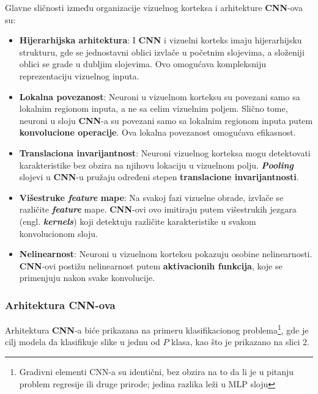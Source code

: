 \documentclass[12pt]{article}
\begin{document}
   Glavne sličnosti \cite{human_visual_cortex} između organizacije vizuelnog korteksa i arhitekture \textbf{CNN}-ova su:
   \begin{itemize}
   \item \textbf{Hijerarhijska arhitektura}: I \textbf{CNN} i vizuelni korteks imaju hijerarhijsku strukturu, 
   gde se jednostavni oblici izvlače u početnim slojevima, a složeniji oblici se grade u dubljim slojevima. 
   Ovo omogućava kompleksniju reprezentaciju vizuelnog inputa.
   \item \textbf{Lokalna povezanost}: Neuroni u vizuelnom korteksu su povezani samo sa 
   lokalnim regionom inputa, a ne sa celim vizuelnim poljem. Slično tome, neuroni 
   u sloju \textbf{CNN}-a su povezani samo sa lokalnim regionom inputa putem \textbf{konvolucione operacije}. 
   Ova lokalna povezanost omogućava efikasnost.
   \item \textbf{Translaciona invarijantnost}: Neuroni vizuelnog korteksa mogu detektovati karakteristike
    bez obzira na njihovu lokaciju u vizuelnom polju. \textbf{\textit{Pooling}} slojevi u \textbf{CNN}-u pružaju određeni 
    stepen \textbf{translacione invarijantnosti}.
    \item \textbf{Višestruke \textit{feature} mape}: Na svakoj fazi vizuelne obrade, izvlače se različite \textbf{\textit{feature}} mape.
    \textbf{CNN}-ovi ovo imitiraju putem višestrukih jezgara (engl. \textbf{\textit{kernels}}) koji detektuju različite karakteristike
      u svakom konvolucionom sloju.
   \item \textbf{Nelinearnost}: Neuroni u vizuelnom korteksu pokazuju osobine nelinearnosti. 
   \textbf{CNN}-ovi postižu nelinearnost putem \textbf{aktivacionih funkcija}, koje se primenjuju nakon svake konvolucije.
   
   \end{itemize}
   
   \newpage

   \subsubsection{Arhitektura \textbf{CNN}-ova}
   Arhitektura \textbf{CNN}-a biće prikazana na primeru klasifikacionog
    problema\footnote{Gradivni elementi CNN-a su identični, bez obzira na to
     da li je u pitanju problem regresije ili druge prirode; jedina razlika leži u MLP sloju}, 
     gde je cilj modela da klasifikuje slike u jednu od $P$ klasa, kao što je prikazano na slici 2.
\end{document}
